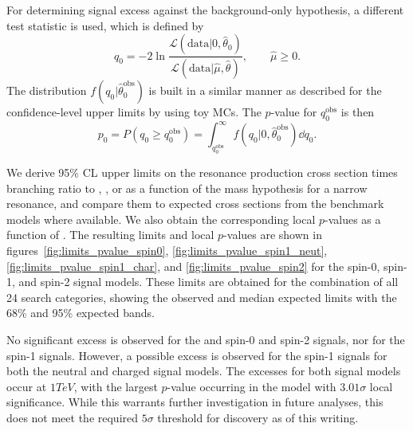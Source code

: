 For determining signal excess against the background-only hypothesis, a different test statistic is used, which is defined by
\begin{equation}
  q_0=-2\ln\frac{\mathcal{L}(\mathrm{data}|0,\hat{\theta}_0)}{\mathcal{L}(\mathrm{data}|\hat{\mu},\hat{\theta})},\qquad \hat{\mu}\geq0.
\end{equation}
The distribution $f(q_0|\hat{\theta}_0^\mathrm{obs})$ is built in a similar manner as described for the confidence-level upper limits by using toy MCs.
The $p$-value for $q_0^\mathrm{obs}$ is then
\begin{equation}
  p_0=P(q_0\geq q_0^\mathrm{obs})=\int_{q_0^\mathrm{obs}}^\infty f(q_0|0,\hat{\theta}_0^\mathrm{obs})\dd{q_0}.
\end{equation}

We derive 95\% CL upper limits on the resonance production cross section times branching ratio to \WW, \WZ, or \WH as a function of the mass hypothesis \MX for a narrow resonance, and compare them to expected cross sections from the benchmark models where available.
We also obtain the corresponding local $p$-values as a function of \MX.
The resulting limits and local $p$-values are shown in figures~\ref{fig:limits_pvalue_spin0}, \ref{fig:limits_pvalue_spin1_neut}, \ref{fig:limits_pvalue_spin1_char}, and \ref{fig:limits_pvalue_spin2} for the spin-0, spin-1, and spin-2 signal models.
These limits are obtained for the combination of all 24 search categories, showing the observed and median expected limits with the 68\% and 95\% expected bands.

No significant excess is observed for the \ggF and \VBF spin-0 and spin-2 signals, nor for the \DY spin-1 signals.
However, a possible excess is observed for the \VBF spin-1 signals for both the neutral and charged signal models.
The excesses for both signal models occur at $1\unit{TeV}$, with the largest $p$-value occurring in the \VBF\WprtoWZ model with $3.01\sigma$ local significance.
While this warrants further investigation in future analyses, this does not meet the required $5\sigma$ threshold for discovery as of this writing.

